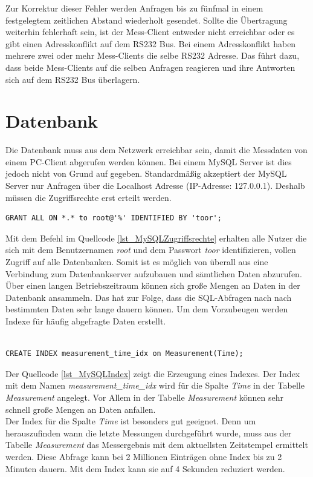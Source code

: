 Zur Korrektur dieser Fehler werden Anfragen bis zu fünfmal in einem festgelegtem zeitlichen Abstand wiederholt gesendet. Sollte die Übertragung weiterhin fehlerhaft sein, ist der Mess-Client entweder nicht erreichbar oder es gibt einen Adresskonflikt auf dem RS232 Bus. Bei einem Adresskonflikt haben mehrere zwei oder mehr Mess-Clients die selbe RS232 Adresse. Das führt dazu, dass beide Mess-Clients auf die selben Anfragen reagieren und ihre Antworten sich auf dem RS232 Bus überlagern.




\section{Datenbank}

Die Datenbank muss aus dem Netzwerk erreichbar sein, damit die Messdaten von einem PC-Client abgerufen werden können. Bei einem MySQL Server ist dies jedoch nicht von Grund auf gegeben. Standardmäßig akzeptiert der MySQL Server nur Anfragen über die Localhost Adresse (IP-Adresse: 127.0.0.1). Deshalb müssen die Zugriffsrechte erst erteilt werden.\\

\begin{lstlisting}[caption={MySQL Zugriffsrechte},label=lst_MySQLZugriffsrechte]
GRANT ALL ON *.* to root@'%' IDENTIFIED BY 'toor';
\end{lstlisting}

Mit dem Befehl im Quellcode \ref{lst_MySQLZugriffsrechte} erhalten alle Nutzer die sich mit dem Benutzernamen \textit{root} und dem Passwort \textit{toor} identifizieren, vollen Zugriff auf alle Datenbanken. Somit ist es möglich von überall aus eine Verbindung zum Datenbankserver aufzubauen und sämtlichen Daten abzurufen.\\

Über einen langen Betriebszeitraum können sich große Mengen an Daten in der Datenbank ansammeln. Das hat zur Folge, dass die SQL-Abfragen nach nach bestimmten Daten sehr lange dauern können. Um dem Vorzubeugen werden Indexe für häufig abgefragte Daten erstellt.\\

\begin{lstlisting}[caption={MySQL Index},label=lst_MySQLIndex]

CREATE INDEX measurement_time_idx on Measurement(Time);

\end{lstlisting}


Der Quellcode \ref{lst_MySQLIndex} zeigt die Erzeugung eines Indexes. Der Index mit dem Namen \textit{measurement\_time\_idx} wird für die Spalte \textit{Time} in der Tabelle \textit{Measurement} angelegt. Vor Allem in der Tabelle \textit{Measurement} können sehr schnell große Mengen an Daten anfallen.\\
Der Index für die Spalte \textit{Time} ist besonders gut geeignet. Denn um herauszufinden wann die letzte Messungen durchgeführt wurde, muss aus der Tabelle \textit{Measurement} das Messergebnis mit dem aktuellsten Zeitstempel ermittelt werden. Diese Abfrage kann bei 2 Millionen Einträgen ohne Index bis zu  2 Minuten dauern. Mit dem Index kann sie auf 4 Sekunden reduziert werden.

